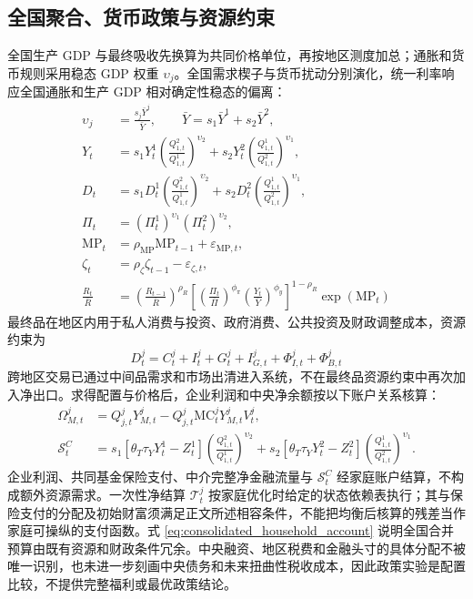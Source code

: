 \documentclass[12pt,UTF8]{ctexart}
\newcommand{\MC}{\mathrm{MC}}
\newcommand{\MP}{\mathrm{MP}}
\begin{document}
	\subsection{全国聚合、货币政策与资源约束}
	全国生产 GDP 与最终吸收先换算为共同价格单位，再按地区测度加总；通胀和货币规则采用稳态 GDP 权重 $\upsilon_j$。全国需求楔子与货币扰动分别演化，统一利率响应全国通胀和生产 GDP 相对确定性稳态的偏离：
	\begin{align}
		\upsilon_j&=\frac{s_j\bar Y^j}{\bar Y},\qquad
		\bar Y=s_1\bar Y^1+s_2\bar Y^2, \label{a39w}\\
		Y_t&=s_1Y_t^1\left(\frac{Q_{1,t}^2}{Q_{1,t}^1}\right)^{\upsilon_2}
		+s_2Y_t^2\left(\frac{Q_{1,t}^1}{Q_{1,t}^2}\right)^{\upsilon_1}, \label{a39y}\\
		D_t&=s_1D_t^1\left(\frac{Q_{1,t}^2}{Q_{1,t}^1}\right)^{\upsilon_2}
		+s_2D_t^2\left(\frac{Q_{1,t}^1}{Q_{1,t}^2}\right)^{\upsilon_1}, \label{a39ya}\\
		\Pi_t &=(\Pi_t^1)^{\upsilon_1}(\Pi_t^2)^{\upsilon_2}, \label{a39pi}\\
		\MP_t &=\rho_{\MP}\MP_{t-1}+\varepsilon_{\MP,t}, \label{a39mp}\\
		\zeta_t &=\rho_\zeta \zeta_{t-1} - \varepsilon_{\zeta,t}, \label{a41D}\\
		\frac{R_t}{\bar R}
		&=\left(\frac{R_{t-1}}{\bar R}\right)^{\rho_R}
		\left[
		\left(\frac{\Pi_t}{\bar\Pi}\right)^{\phi_\pi}
		\left(\frac{Y_t}{\bar Y}\right)^{\phi_y}
		\right]^{1-\rho_R}
		\exp(\MP_t) \label{a41}
	\end{align}
	最终品在地区内用于私人消费与投资、政府消费、公共投资及财政调整成本，资源约束为
	\begin{equation}
		D_t^j=C_t^j+I_t^j+G_t^j+I_{G,t}^j+\Phi_{I,t}^j+\Phi_{B,t}^j \label{a42}
	\end{equation}
	跨地区交易已通过中间品需求和市场出清进入系统，不在最终品资源约束中再次加入净出口。求得配置与价格后，企业利润和中央净余额按以下账户关系核算：
	\begin{align}
		\Omega_{M,t}^j&=Q_{j,t}^jY_{M,t}^j-Q_{j,t}^j\MC_t^jY_{M,t}^jV_t^j,\\
		\mathcal S_t^C&=
		s_1\left[\theta_T\tau_Y Y_t^1-Z_t^1\right]
		\left(\frac{Q_{1,t}^2}{Q_{1,t}^1}\right)^{\upsilon_2}
		+s_2\left[\theta_T\tau_Y Y_t^2-Z_t^2\right]
		\left(\frac{Q_{1,t}^1}{Q_{1,t}^2}\right)^{\upsilon_1}.
	\end{align}
	企业利润、共同基金保险支付、中介完整净金融流量与 $\mathcal S_t^C$ 经家庭账户结算，不构成额外资源需求。一次性净结算 $\mathcal T_t^j$ 按家庭优化时给定的状态依赖表执行；其与保险支付的分配及初始财富须满足正文所述相容条件，不能把均衡后核算的残差当作家庭可操纵的支付函数。式 \eqref{eq:consolidated_household_account} 说明全国合并预算由既有资源和财政条件冗余。中央融资、地区税费和金融头寸的具体分配不被唯一识别，也未进一步刻画中央债务和未来扭曲性税收成本，因此政策实验是配置比较，不提供完整福利或最优政策结论。
	
\end{document}
